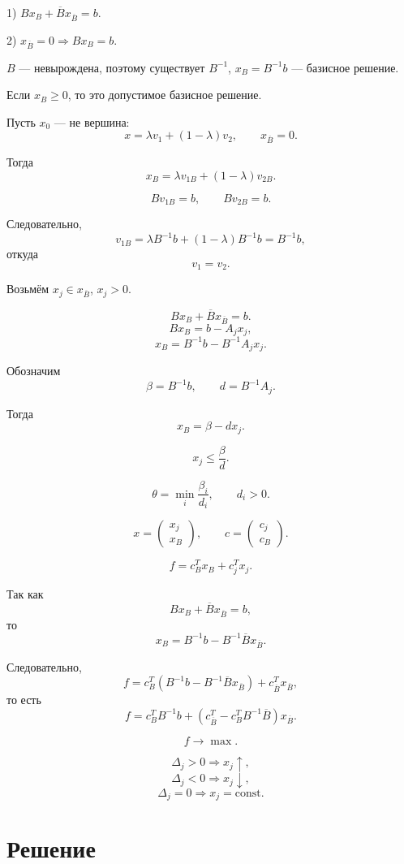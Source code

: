 \documentclass[12pt,a4paper]{article}
\begin{document}
1) $Bx_B+\overline Bx_{\overline B}=b$.

2) $x_{\overline B}=0\Rightarrow Bx_B=b$.

$B$ --- невырождена, поэтому существует $B^{-1}$, $x_B=B^{-1}b$ --- базисное решение.

Если $x_B\geq0$, то это допустимое базисное решение.

Пусть $x_0$ --- не вершина:
\[
x=\lambda v_1+(1-\lambda)v_2,
\qquad
x_{\overline B}=0.
\]

Тогда
\[
x_B=\lambda v_{1B}+(1-\lambda)v_{2B}.
\]

\[
Bv_{1B}=b,
\qquad
Bv_{2B}=b.
\]

Следовательно,
\[
v_{1B}=\lambda B^{-1}b+(1-\lambda)B^{-1}b=B^{-1}b,
\]
откуда
\[
v_1=v_2.
\]

Возьмём $x_j\in x_{\overline B}$, $x_j>0$.

\[
Bx_B+\overline Bx_{\overline B}=b.
\]
\[
Bx_B=b-A_jx_j,
\]
\[
x_B=B^{-1}b-B^{-1}A_jx_j.
\]

Обозначим
\[
\beta=B^{-1}b,
\qquad
d=B^{-1}A_j.
\]

Тогда
\[
x_B=\beta-dx_j.
\]

\[
x_j\leq\frac{\beta}{d}.
\]

\[
\theta=\min_i\frac{\beta_i}{d_i},
\qquad d_i>0.
\]

\[
x=
\begin{pmatrix}
x_j\\
x_B
\end{pmatrix},
\qquad
c=
\begin{pmatrix}
c_j\\
c_B
\end{pmatrix}.
\]

\[
f=c_B^Tx_B+c_j^Tx_j.
\]

Так как
\[
Bx_B+\overline Bx_{\overline B}=b,
\]
то
\[
x_B=B^{-1}b-B^{-1}\overline Bx_{\overline B}.
\]

Следовательно,
\[
f
=
c_B^T
\left(
B^{-1}b-B^{-1}\overline Bx_{\overline B}
\right)
+c_{\overline B}^Tx_{\overline B},
\]
то есть
\[
f
=
c_B^TB^{-1}b+
\left(
c_{\overline B}^T-c_B^TB^{-1}\overline B
\right)x_{\overline B}.
\]

\[
f\to\max.
\]

\[
\Delta_j>0\Rightarrow x_j\uparrow,
\]
\[
\Delta_j<0\Rightarrow x_j\downarrow,
\]
\[
\Delta_j=0\Rightarrow x_j=\mathrm{const}.
\]

\newpage

\section{Решение}
\end{document}
